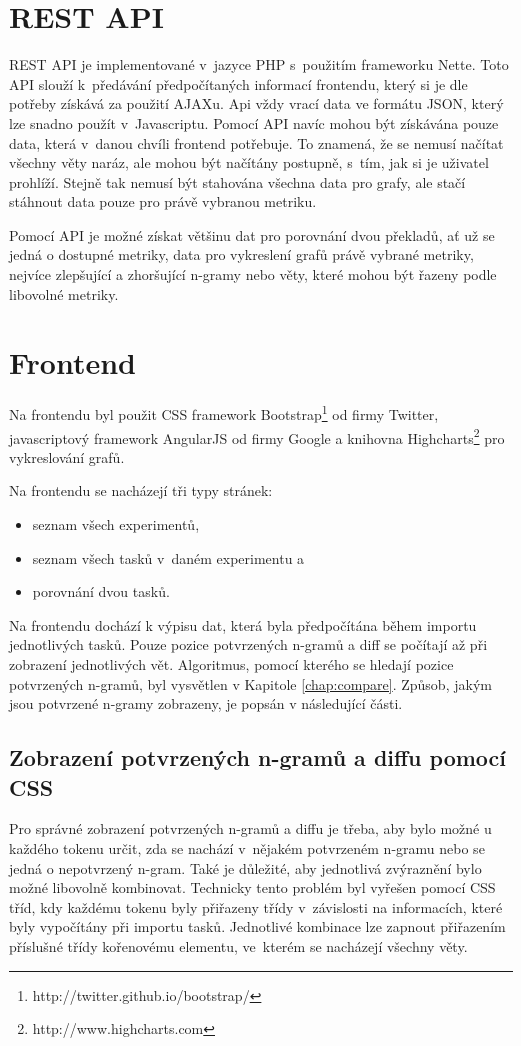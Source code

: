\section{REST API}
REST API je implementované v~jazyce PHP s~použitím frameworku Nette.
Toto API slouží k~předávání předpočítaných informací frontendu,
  který si je dle potřeby získává za použití AJAXu.
Api vždy vrací data ve formátu JSON,
  který lze snadno použít v~Javascriptu.
Pomocí API navíc mohou být získávána pouze data,
  která v~danou chvíli frontend potřebuje.
To znamená, že se nemusí načítat všechny věty naráz,
  ale mohou být načítány postupně,
  s~tím, jak si je uživatel prohlíží.
Stejně tak nemusí být stahována všechna data pro grafy,
  ale stačí stáhnout data pouze pro právě vybranou metriku.

Pomocí API je možné získat většinu dat pro porovnání dvou překladů,
  ať už se jedná o dostupné metriky,
  data pro vykreslení grafů právě vybrané metriky,
  nejvíce zlepšující a zhoršující \mbox{n-gramy}
  nebo věty,
  které mohou být řazeny podle libovolné metriky.

\section{Frontend}
Na frontendu byl použit CSS framework Bootstrap\footnote{http://twitter.github.io/bootstrap/} od firmy Twitter,
  javascriptový framework AngularJS od firmy Google
  a knihovna Highcharts\footnote{http://www.highcharts.com} pro vykreslování grafů.

Na frontendu se nacházejí tři typy stránek:
\begin{itemize}
  \item seznam všech experimentů,
  \item seznam všech tasků v~daném experimentu a
  \item porovnání dvou tasků.
\end{itemize}

Na frontendu dochází k výpisu dat, která byla předpočítána během importu jednotlivých tasků.
Pouze pozice potvrzených \mbox{n-gramů} a diff se počítají až při zobrazení jednotlivých vět.
Algoritmus, pomocí kterého se hledají pozice potvrzených \mbox{n-gramů}, byl vysvětlen v Kapitole \ref{chap:compare}.
Způsob, jakým jsou potvrzené \mbox{n-gramy} zobrazeny, je popsán v následující části.

\subsection{Zobrazení potvrzených \mbox{n-gramů} a diffu pomocí CSS}
Pro správné zobrazení potvrzených \mbox{n-gramů} a diffu je třeba,
  aby bylo možné u každého tokenu určit,
  zda se nachází v~nějakém potvrzeném \mbox{n-gramu} nebo se jedná o nepotvrzený \mbox{n-gram}.
Také je důležité,
  aby jednotlivá zvýraznění bylo možné libovolně kombinovat.
Technicky tento problém byl vyřešen pomocí CSS tříd,
  kdy každému tokenu byly přiřazeny třídy v~závislosti na informacích,
  které byly vypočítány při importu tasků.
Jednotlivé kombinace lze zapnout přiřazením příslušné třídy kořenovému elementu,
  ve~kterém se nacházejí všechny věty.

